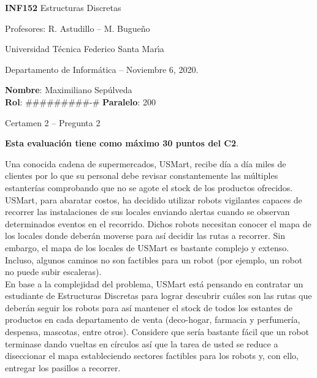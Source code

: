 \documentclass[letterpaper,10pt]{article}
\begin{document}
\thispagestyle{empty}

\begin{minipage}[t]{0.6\textwidth}

{\LARGE \textbf{INF152} Estructuras Discretas}

{\large Profesores: R. Astudillo -- M. Bugueño}

Universidad Técnica Federico Santa Mar\'{\i}a

Departamento de Informática -- Noviembre 6, 2020.

\end{minipage}
\hfill
\begin{minipage}[t]{0.35\textwidth}
\textbf{Nombre}: Maximiliano Sepúlveda\\[0.3cm]
\textbf{Rol}: #########-# \textbf{Paralelo}: 200
\end{minipage}

\vspace{0.8cm}

{\Large Certamen 2 -- Pregunta 2}

\vspace{0.4cm}

\textbf{Esta evaluación tiene como máximo 30 puntos del C2}.

Una conocida cadena de supermercados, USMart, recibe día a día miles de clientes por lo que su personal debe revisar constantemente las múltiples estanterías comprobando que no se agote el stock de los productos ofrecidos. USMart, para abaratar costos, ha decidido utilizar robots vigilantes capaces de recorrer las instalaciones de sus locales enviando alertas cuando se observan determinados eventos en el recorrido. Dichos robots necesitan conocer el mapa de los locales donde deberán moverse para así decidir las rutas a recorrer. Sin embargo, el mapa de los locales de USMart es bastante complejo y extenso. Incluso, algunos caminos no son factibles para un robot (por ejemplo, un robot no puede subir escaleras). \\
En base a la complejidad del problema, USMart está pensando en contratar un estudiante de Estructuras Discretas para lograr descubrir cuáles son las rutas que deberán seguir los robots para así mantener el stock de todos los estantes de productos en cada departamento de venta (deco-hogar, farmacia y perfumería, despensa, mascotas, entre otros). Considere que sería bastante fácil que un robot terminase dando vueltas en círculos así que la tarea de usted se reduce a diseccionar el mapa estableciendo sectores factibles para los robots y, con ello, entregar los pasillos a recorrer.
\end{document}
